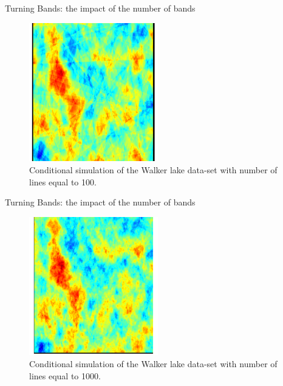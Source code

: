 \begin{frame}{Turning Bands: the impact of the number of bands}
\begin{figure}
\begin{center}
\includegraphics[width=0.5\textwidth]{figs/walker_lake_tb_n_100.pdf}
\end{center}
\caption{Conditional simulation of the Walker lake data-set with number of lines equal to 100.}
\label{fig:gaussian_unc_simulation}
\end{figure}
\end{frame}

\begin{frame}{Turning Bands: the impact of the number of bands}
\begin{figure}
\begin{center}
\includegraphics[width=0.5\textwidth]{figs/walker_lake_tb_n_1000.pdf}
\end{center}
\caption{Conditional simulation of the Walker lake data-set with number of lines equal to 1000.}
\label{fig:gaussian_unc_simulation}
\end{figure}
\end{frame}

